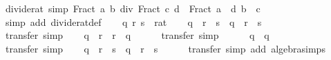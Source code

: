 \begin{isabellebody}
\isanewline
{}\isamarkupfalse%
\ divide{\isacharunderscore}{\kern0pt}rat\ {\isacharbrackleft}{\kern0pt}simp{\isacharbrackright}{\kern0pt}{\isacharcolon}{\kern0pt}\ {\isachardoublequoteopen}Fract\ a\ b\ div\ Fract\ c\ d\ {\isacharequal}{\kern0pt}\ Fract\ {\isacharparenleft}{\kern0pt}a\ {\isacharasterisk}{\kern0pt}\ d{\isacharparenright}{\kern0pt}\ {\isacharparenleft}{\kern0pt}b\ {\isacharasterisk}{\kern0pt}\ c{\isacharparenright}{\kern0pt}{\isachardoublequoteclose}\isanewline
%
\isadelimproof
\ \ %
\endisadelimproof
%
\isatagproof
{}\isamarkupfalse%
\ {\isacharparenleft}{\kern0pt}simp\ add{\isacharcolon}{\kern0pt}\ divide{\isacharunderscore}{\kern0pt}rat{\isacharunderscore}{\kern0pt}def{\isacharparenright}{\kern0pt}%
\endisatagproof
{\isafoldproof}%
%
\isadelimproof
\isanewline
%
\endisadelimproof
\isanewline
{}\isamarkupfalse%
\isanewline
%
\isadelimproof
%
\endisadelimproof
%
\isatagproof
{}\isamarkupfalse%
\isanewline
\ \ \isamarkupfalse%
\ q\ r\ s\ {\isacharcolon}{\kern0pt}{\isacharcolon}{\kern0pt}\ rat\isanewline
\ \ \isamarkupfalse%
\ {\isachardoublequoteopen}{\isacharparenleft}{\kern0pt}q\ {\isacharasterisk}{\kern0pt}\ r{\isacharparenright}{\kern0pt}\ {\isacharasterisk}{\kern0pt}\ s\ {\isacharequal}{\kern0pt}\ q\ {\isacharasterisk}{\kern0pt}\ {\isacharparenleft}{\kern0pt}r\ {\isacharasterisk}{\kern0pt}\ s{\isacharparenright}{\kern0pt}{\isachardoublequoteclose}\isanewline
\ \ \ \ \isamarkupfalse%
\ transfer\ simp\isanewline
\ \ \isamarkupfalse%
\ {\isachardoublequoteopen}q\ {\isacharasterisk}{\kern0pt}\ r\ {\isacharequal}{\kern0pt}\ r\ {\isacharasterisk}{\kern0pt}\ q{\isachardoublequoteclose}\isanewline
\ \ \ \ \isamarkupfalse%
\ transfer\ simp\isanewline
\ \ \isamarkupfalse%
\ {\isachardoublequoteopen}{}\ {\isacharasterisk}{\kern0pt}\ q\ {\isacharequal}{\kern0pt}\ q{\isachardoublequoteclose}\isanewline
\ \ \ \ \isamarkupfalse%
\ transfer\ simp\isanewline
\ \ \isamarkupfalse%
\ {\isachardoublequoteopen}{\isacharparenleft}{\kern0pt}q\ {\isacharplus}{\kern0pt}\ r{\isacharparenright}{\kern0pt}\ {\isacharplus}{\kern0pt}\ s\ {\isacharequal}{\kern0pt}\ q\ {\isacharplus}{\kern0pt}\ {\isacharparenleft}{\kern0pt}r\ {\isacharplus}{\kern0pt}\ s{\isacharparenright}{\kern0pt}{\isachardoublequoteclose}\isanewline
\ \ \ \ \isamarkupfalse%
\ transfer\ {\isacharparenleft}{\kern0pt}simp\ add{\isacharcolon}{\kern0pt}\ algebra{\isacharunderscore}{\kern0pt}simps{\isacharparenright}{\kern0pt}\isanewline

\end{isabellebody}
